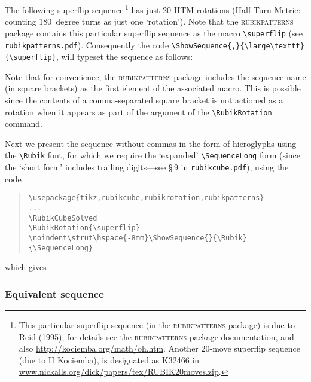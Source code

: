 \documentclass[a4paper]{article}
\begin{document}
The following superflip sequence\,\footnote{This particular  superflip sequence 
(in the \textsc{rubikpatterns} package) is due to Reid (1995); 
for details see the \textsc{rubikpatterns} package 
documentation, and also  \url{http://kociemba.org/math/oh.htm}. 
Another 20-move superflip sequence (due to H Kociemba),  is designated as  K32466  
  in  \url{www.nickalls.org/dick/papers/tex/RUBIK20moves.zip}.} 
has just 20  HTM rotations (Half Turn Metric: counting 180~degree turns as just 
one `rotation'). Note that the \textsc{rubikpatterns} package contains  this particular  
superflip sequence  as the macro \verb!\superflip!
(see \texttt{rubikpatterns.pdf}). Consequently  the  code 
\verb!\ShowSequence{,}{\large\texttt}{\superflip}!, will typeset the sequence
as follows:

\begin{center}
\ShowSequence{,}{\texttt}{\superflip}
\end{center}
Note that for convenience, the \textsc{rubikpatterns} package includes the sequence 
name (in square brackets)  as the first element of the associated  macro. 
This is possible since the contents of a comma-separated  square bracket  is not 
actioned as a rotation when it appears as part of the argument of  
the \verb!\RubikRotation! command.   

\pagebreak

Next  we present the sequence without commas in the form of hieroglyphs using 
the \verb!\Rubik! font, for which we require the `expanded' \verb!\SequenceLong! 
form (since the `short form' includes trailing digits---see \S\,9 in  
\texttt{rubikcube.pdf}), using the code

\begin{quote}
\begin{verbatim}
\usepackage{tikz,rubikcube,rubikrotation,rubikpatterns}
...
\RubikCubeSolved
\RubikRotation{\superflip}
\noindent\strut\hspace{-8mm}\ShowSequence{}{\Rubik}{\SequenceLong}
\end{verbatim}
\end{quote}
which gives


\bigskip

\RubikCubeSolved
\RubikRotation{\superflip}
\noindent\strut\hspace{-8mm}\ShowSequence{}{\Rubik}{\SequenceLong}


\bigskip

\subsubsection*{Equivalent sequence}
\end{document}
